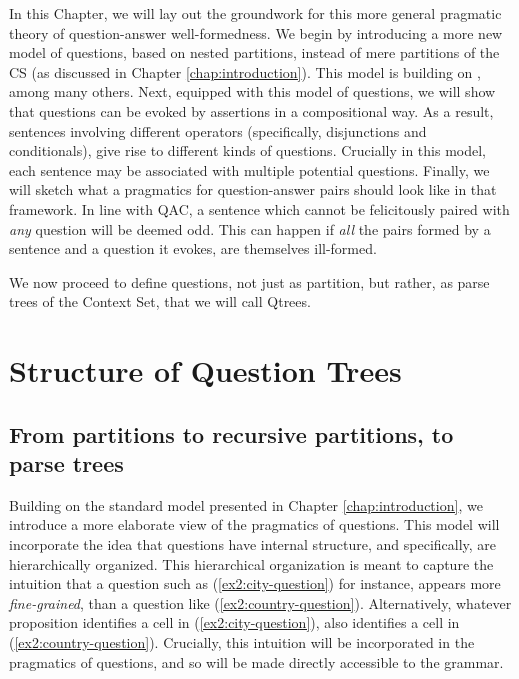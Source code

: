 In this Chapter, we will lay out the groundwork for this more general pragmatic theory of question-answer well-formedness. We begin by introducing a more new model of questions, based on nested partitions, instead of mere partitions of the CS (as discussed in Chapter \ref{chap:introduction}). This model is building on \citet{Buring2003,Ippolito2019,Zhang2022}, among many others. Next, equipped with this model of questions, we will show that questions can be evoked by assertions in a compositional way. As a result, sentences involving different operators (specifically, disjunctions and conditionals), give rise to different kinds of questions. Crucially in this model, each sentence may be associated with multiple potential questions. Finally, we will sketch what a pragmatics for question-answer pairs should look like in that framework. In line with QAC, a sentence which cannot be felicitously paired with \textit{any} question will be deemed odd. This can happen if \textit{all} the pairs formed by a sentence and a question it evokes, are themselves ill-formed. 

We now proceed to define questions, not just as partition, but rather, as parse trees of the Context Set, that we will call Qtrees.

\section{Structure of Question Trees}

\subsection{From partitions to recursive partitions, to parse trees}\label{sec:nested-partition}
Building on the standard model presented in Chapter \ref{chap:introduction}, we introduce a more elaborate view of the pragmatics of questions. This model will incorporate the idea that questions have internal structure, and specifically, are hierarchically organized. This hierarchical organization is meant to capture the intuition that a question such as (\ref{ex2:city-question}) for instance, appears more \textit{fine-grained}, than a question like (\ref{ex2:country-question}). Alternatively, whatever proposition identifies a cell in (\ref{ex2:city-question}), also identifies a cell in (\ref{ex2:country-question}). Crucially, this intuition will be incorporated in the pragmatics of questions, and so will be made directly accessible to the grammar.

\begin{exe}
	\ex 
	\begin{xlist}
		\label{ex2:city-question}
		\label{ex2:country-question}
	\end{xlist}
\end{exe}

